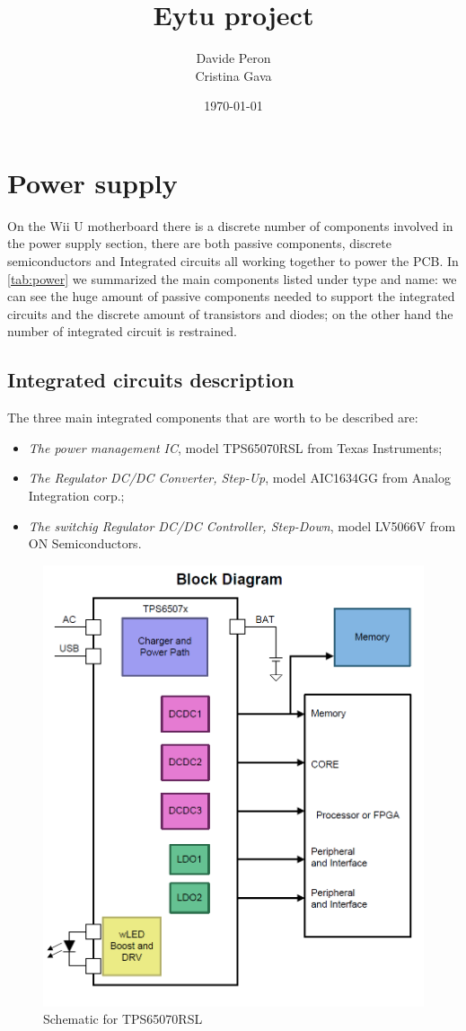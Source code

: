 \documentclass[11pt,a4paper,titlepage]{article}
\title{\blue Eytu project}
\author{Davide Peron\\ Cristina Gava}
\date{\today}
\begin{document}
\maketitle

\tableofcontents
\clearpage

\section{Power supply}
On the Wii U motherboard there is a discrete number of components involved in the power supply section, there are both passive components, discrete semiconductors and Integrated circuits all working together to power the PCB. In \autoref{tab:power} we summarized the main components listed under type and name: we can see the huge amount of passive components needed to support the integrated circuits and the discrete amount of transistors and diodes; on the other hand the number of integrated circuit is restrained.

\subsection{Integrated circuits description}
The three main integrated components that are worth to be described are:
\begin{itemize}
\item \textit{The power management IC}, model TPS65070RSL from Texas Instruments;
\item \textit{The Regulator DC/DC Converter, Step-Up}, model AIC1634GG from Analog Integration corp.;
\item \textit{The switchig Regulator DC/DC Controller, Step-Down}, model LV5066V from ON Semiconductors.
\end{itemize}

\begin{figure}
\centering
\includegraphics[width = .7\textwidth]{power_managIC.png}
\caption{Schematic for TPS65070RSL}
\label{fig:TPS65070RSL}
\end{figure}
\end{document}
